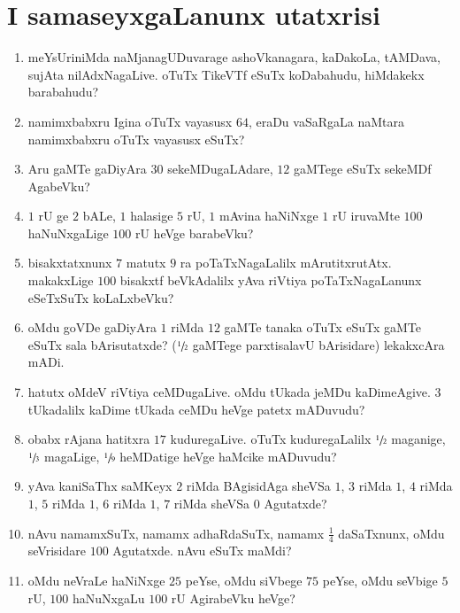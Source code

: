 \chapter{I samaseyxgaLanunx utatxrisi}

\begin{enumerate}
  \renewcommand{\labelenumi}{\rm(\theenumi)}
  \itemsep=2pt
\item meYsUriniMda naMjanagUDuvarage ashoVkanagara, kaDakoLa, tAMDava, sujAta nilAdxNagaLive. oTuTx TikeVTf eSuTx koDabahudu, hiMdakekx barabahudu?

\item namimxbabxru Igina oTuTx vayasusx $64$, eraDu vaSaRgaLa naMtara namimxbabxru oTuTx vayasusx eSuTx?

\item Aru gaMTe gaDiyAra $30$ sekeMDugaLAdare, $12$ gaMTege eSuTx sekeMDf AgabeVku?

\item $1$ rU ge $2$ bALe, $1$ halasige $5$ rU, $1$ mAvina haNiNxge $1$ rU iruvaMte $100$ haNuNxgaLige $100$ rU heVge barabeVku?

\item bisakxtatxnunx $7$ matutx $9$ ra poTaTxNagaLalilx mArutitxrutAtx. makakxLige $100$ bisakxtf beVkAdalilx yAva riVtiya poTaTxNagaLanunx eSeTxSuTx koLaLxbeVku?

\item oMdu goVDe gaDiyAra $1$ riMda $12$ gaMTe tanaka oTuTx eSuTx gaMTe eSuTx sala bArisutatxde? ($\sfrac{1}{2}$ gaMTege parxtisalavU bArisidare) lekakxcAra mADi.

\item hatutx oMdeV riVtiya ceMDugaLive. oMdu tUkada jeMDu kaDimeAgive. $3$ tUkadalilx kaDime tUkada ceMDu heVge patetx mADuvudu?

\item obabx rAjana hatitxra $17$ kuduregaLive. oTuTx kuduregaLalilx $\sfrac{1}{2}$ maganige, $\sfrac{1}{3}$ magaLige, $\sfrac{1}{9}$ heMDatige heVge haMcike mADuvudu?

\item yAva kaniSaThx saMKeyx $2$ riMda BAgisidAga sheVSa $1$, $3$ riMda $1$, $4$ riMda $1$, $5$ riMda $1$, $6$ riMda $1$, $7$ riMda sheVSa $0$ Agutatxde?

\item nAvu namamxSuTx, namamx adhaRdaSuTx, namamx $\frac{1}{4}$ daSaTxnunx, oMdu seVrisidare $100$ Agutatxde. nAvu eSuTx maMdi?

\item oMdu neVraLe haNiNxge $25$ peYse, oMdu siVbege $75$ peYse, oMdu seVbige $5$ rU, $100$ haNuNxgaLu $100$ rU AgirabeVku heVge?


\end{enumerate}
